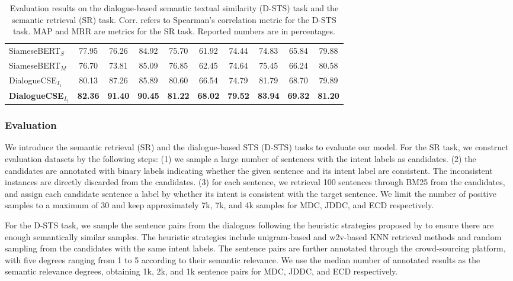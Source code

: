 \documentclass[11pt]{article}
\begin{document}
\begin{table}[htb]
\begin{tabular}{l|ccc|ccc|ccc}
        SiameseBERT$_{S}$ & 77.95 & 76.26 & 84.92 & 75.70 & 61.92 & 74.44 & 74.83 & 65.84 & 79.88  \\
        SiameseBERT$_{M}$ & 76.70 & 73.81 & 85.09 & 76.85 & 62.45 & 74.64 & 75.45 & 66.24 & 80.58  \\
        \midrule
        
        DialogueCSE$_{I_{1}}$ & 80.13	& 87.26 & 85.89 & 80.60 & 66.54 & 74.79 & 81.79 & 68.70 & 79.89  \\
        
        \textbf{DialogueCSE$_{I_{2}}$}
        & \textbf{82.36} & \textbf{91.40} & \textbf{90.45} 
        & \textbf{81.22} & \textbf{68.02} & \textbf{79.52} 
        & \textbf{83.94} & \textbf{69.32} & \textbf{81.20}  \\
        
        \bottomrule
    \end{tabular}
    \caption{Evaluation results on the dialogue-based semantic textual similarity (D-STS) task and the semantic retrieval (SR) task. Corr. refers to Spearman's correlation metric for the D-STS task. MAP and MRR are metrics for the SR task. Reported numbers are in percentages.}
    \label{main experiment result}
\end{table}

\subsubsection{Evaluation}
We introduce the semantic retrieval (SR) and the dialogue-based STS (D-STS) tasks to evaluate our model.
For the SR task, we construct evaluation datasets by the following steps:
(1) we sample a large number of sentences with the intent labels as candidates.
(2) the candidates are annotated with binary labels indicating whether the given sentence and its intent label are consistent.
The inconsistent instances are directly discarded from the candidates.
(3) for each sentence, we retrieval 100 sentences through BM25 \cite{bm25} from the candidates, and assign each candidate sentence a label by whether its intent is consistent with the target sentence.
We limit the number of positive samples to a maximum of 30 and keep approximately 7k, 7k, and 4k samples for MDC, JDDC, and ECD respectively.

For the D-STS task, we sample the sentence pairs from the dialogues following the heuristic strategies proposed by \cite{sts_b} to ensure there are enough semantically similar samples.
The heuristic strategies include unigram-based and w2v-based KNN retrieval methods and random sampling from the candidates with the same intent labels.
The sentence pairs are further annotated through the crowd-sourcing platform, with five degrees ranging from 1 to 5 according to their semantic relevance.
We use the median number of annotated results as the semantic relevance degrees, obtaining 1k, 2k, and 1k sentence pairs for MDC, JDDC, and ECD respectively.
\end{document}
